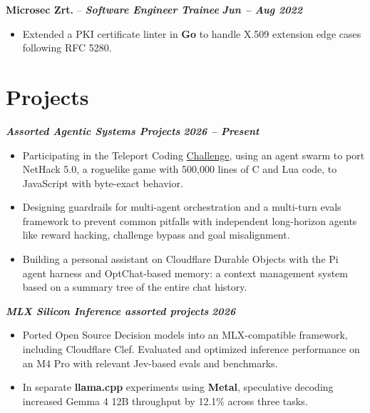 \documentclass[11pt,a4paper]{article}
\newcommand{\experienceheader}[3]{%
    \Needspace{7\baselineskip}%
    \noindent\textbf{#1} -- \textbf{\textit{#2}} \hfill \textbf{\textit{#3}}%
}
\newcommand{\projectheader}[2]{%
    \Needspace{7\baselineskip}%
    \noindent\textbf{\textit{#1}} \hfill \textbf{\textit{#2}}%
}
\begin{document}
\experienceheader{Microsec Zrt.}{Software Engineer Trainee}{Jun -- Aug 2022}
\begin{itemize}
    \item Extended a PKI certificate linter in \textbf{Go} to handle X.509 extension edge cases following RFC 5280.
\end{itemize}

\section{Projects}

\projectheader{Assorted Agentic Systems Projects}{2026 -- Present}
\begin{itemize}
    \item Participating in the Teleport Coding \href{https://mazesofmenace.ai/}{Challenge}, using an agent swarm to port NetHack 5.0, a roguelike game with 500,000 lines of C and Lua code, to JavaScript with byte-exact behavior.
    \item Designing guardrails for multi-agent orchestration and a multi-turn evals framework to prevent common pitfalls with independent long-horizon agents like reward hacking, challenge bypass and goal misalignment.
    \item Building a personal assistant on Cloudflare Durable Objects with the Pi agent harness and OptChat-based memory: a context management system based on a summary tree of the entire chat history.
\end{itemize}

\vspace{3pt}

\projectheader{MLX Silicon Inference assorted projects}{2026}
\begin{itemize}
    \item Ported Open Source Decision models into an MLX-compatible framework, including Cloudflare Clef. Evaluated and optimized inference performance on an M4 Pro with relevant Jev-based evals and benchmarks.
    \item In separate \textbf{llama.cpp} experiments using \textbf{Metal}, speculative decoding increased Gemma 4 12B throughput by 12.1\% across three tasks.
\end{itemize}

\vspace{3pt}
\end{document}
